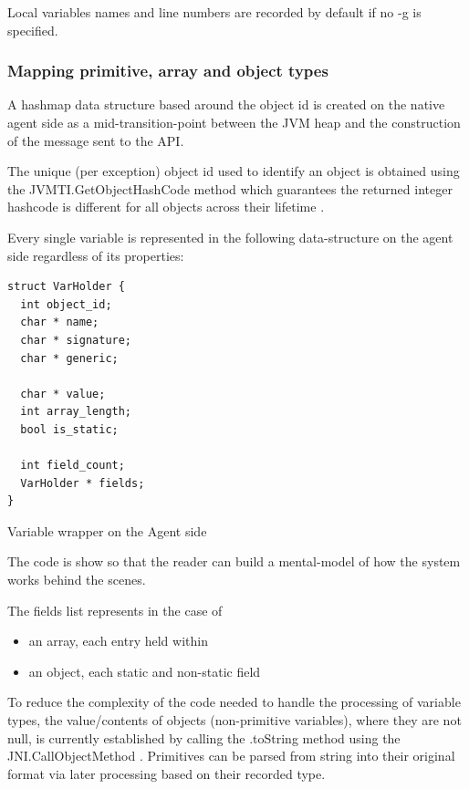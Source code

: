 Local variables names and line numbers are recorded by default if no -g is specified.

\subsubsection{Mapping primitive, array and object types}

A hashmap data structure based around the object id is created on the native agent side as a mid-transition-point between the JVM heap and the construction of the message sent to the API.

The unique (per exception) object id used to identify an object is obtained using the JVMTI.GetObjectHashCode method which guarantees the returned integer hashcode is different for all objects across their lifetime \cite{GetObjectHashCode}. 

Every single variable is represented in the following data-structure on the agent side regardless of its properties:

\begin{listing}[H]
\begin{verbatim}
struct VarHolder {
  int object_id;
  char * name;
  char * signature;
  char * generic;

  char * value;
  int array_length;
  bool is_static;

  int field_count;
  VarHolder * fields;
}
\end{verbatim}
\caption{Variable wrapper on the Agent side}
\end{listing}

The code is show so that the reader can build a mental-model of how the system works behind the scenes.

The fields list represents in the case of
\begin{itemize}
  \item an array, each entry held within
  \item an object, each static and non-static field
\end{itemize}

To reduce the complexity of the code needed to handle the processing of variable types, the value/contents of objects (non-primitive variables), where they are not null, is currently established by calling the .toString method using the JNI.CallObjectMethod \cite{jniMethod}. Primitives can be parsed from string into their original format via later processing based on their recorded type.

~\\

